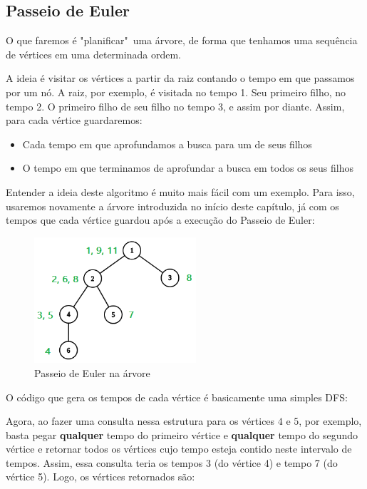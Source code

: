\subsection{Passeio de Euler}

O que faremos é "planificar"\ uma árvore, de forma que tenhamos uma sequência de vértices em uma determinada ordem.

A ideia é visitar os vértices a partir da raiz contando o tempo em que passamos por um nó. A raiz, por exemplo, é visitada no tempo 1. Seu primeiro filho, no tempo 2. O primeiro filho de seu filho no tempo 3, e assim por diante. Assim, para cada vértice guardaremos:

\begin{itemize}
    \item Cada tempo em que aprofundamos a busca para um de seus filhos
    \item O tempo em que terminamos de aprofundar a busca em todos os seus filhos
\end{itemize}

Entender a ideia deste algoritmo é muito mais fácil com um exemplo. Para isso, usaremos novamente a árvore introduzida no início deste capítulo, já com os tempos que cada vértice guardou após a execução do Passeio de Euler:

\vspace{10cm}

\begin{figure}[htb]
\begin{center}
\includegraphics[width=6cm]{images/graph_euler_numbered.png}
\end{center}
\caption{\label{fig:arvore-euler2}Passeio de Euler na árvore}
\end{figure}

O código que gera os tempos de cada vértice é basicamente uma simples DFS:

Agora, ao fazer uma consulta nessa estrutura para os vértices $4$ e $5$, por exemplo, basta pegar \textbf{qualquer} tempo do primeiro vértice e \textbf{qualquer} tempo do segundo vértice e retornar todos os vértices cujo tempo esteja contido neste intervalo de tempos. Assim, essa consulta teria os tempos 3 (do vértice 4) e tempo 7 (do vértice 5). Logo, os vértices retornados são:


